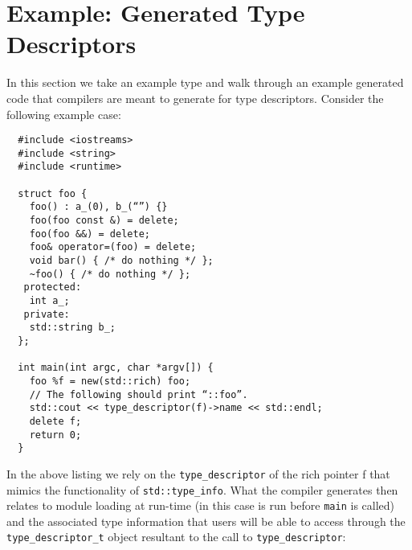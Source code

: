 \section{Example: Generated Type Descriptors}
\label{appendix:example-1}

In this section we take an example type and walk through an example generated
code that compilers are meant to generate for type descriptors. Consider the
following example case:

\begin{verbatim}
  #include <iostreams>
  #include <string>
  #include <runtime>

  struct foo {
    foo() : a_(0), b_(“”) {}
    foo(foo const &) = delete;
    foo(foo &&) = delete;
    foo& operator=(foo) = delete;
    void bar() { /* do nothing */ };
    ~foo() { /* do nothing */ };
   protected:
    int a_;
   private:
    std::string b_;
  };

  int main(int argc, char *argv[]) {
    foo %f = new(std::rich) foo;
    // The following should print “::foo”.
    std::cout << type_descriptor(f)->name << std::endl;
    delete f;
    return 0;
  }
\end{verbatim}

In the above listing we rely on the \verb+type_descriptor+ of the rich pointer f
that mimics the functionality of \verb+std::type_info+. What the compiler
generates then relates to module loading at run-time (in this case is run before
\verb+main+ is called) and the associated type information that users will be
able to access through the \verb+type_descriptor_t+ object resultant to the call
to \verb+type_descriptor+:

